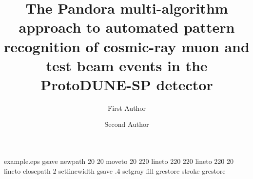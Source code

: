 
%
%
%
%
%
\begin{filecontents*}{example.eps}
gsave
newpath
  20 20 moveto
  20 220 lineto
  220 220 lineto
  220 20 lineto
closepath
2 setlinewidth
gsave
  .4 setgray fill
grestore
stroke
grestore
\end{filecontents*}
%
\RequirePackage{fix-cm}
%
\documentclass{svjour3}                     %
%
\smartqed  %
%
\usepackage{graphicx}
%
%
%
%
%


\title{The Pandora multi-algorithm approach to automated pattern recognition of cosmic-ray muon and test beam events in the ProtoDUNE-SP detector
}


\author{First Author         \and
        Second Author %
}


